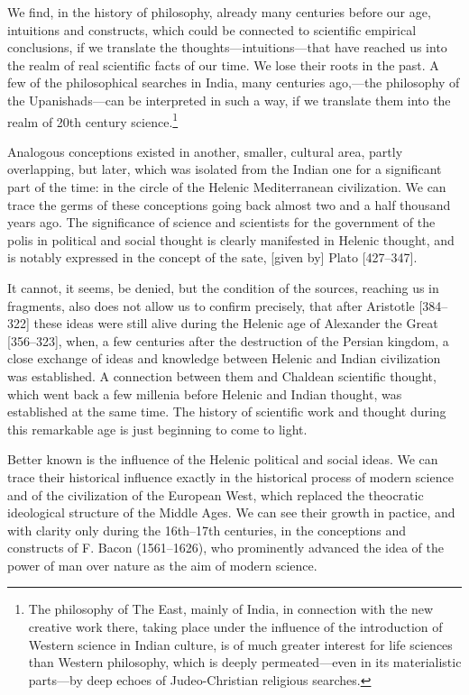 We find, in the history of philosophy, already many centuries before our age,
intuitions and constructs, which could be connected to scientific empirical
conclusions, if we translate the thoughts---intuitions---that have reached us
into the realm of real scientific facts of our time.  We lose their roots in
the past.  A few of the philosophical searches in India, many centuries
ago,---the philosophy of the Upanishads---can be interpreted in such a way, if
we translate them into the realm of 20th century science.\footnote{The
philosophy of The East, mainly of India, in connection with the new creative
work there, taking place under the influence of the introduction of Western
science in Indian culture, is of much greater interest for life sciences than
Western philosophy, which is deeply permeated---even in its materialistic
parts---by deep echoes of Judeo-Christian religious searches.}

Analogous conceptions existed in another, smaller, cultural area, partly
overlapping, but later, which was isolated from the Indian one for a
significant part of the time: in the circle of the Helenic Mediterranean
civilization.  We can trace the germs of these conceptions going back almost
two and a half thousand years ago.  The significance of science and scientists
for the government of the polis in political and social thought is clearly
manifested in Helenic thought, and is notably expressed in the concept of the
sate, [given by] Plato [427--347].

It cannot, it seems, be denied, but the condition of the sources, reaching us
in fragments, also does not allow us to confirm precisely, that after Aristotle
[384--322] these ideas were still alive during the Helenic age of Alexander the
Great [356--323], when, a few centuries after the destruction of the Persian
kingdom, a close exchange of ideas and knowledge between Helenic and Indian
civilization was established.  A connection between them and Chaldean
scientific thought, which went back a few millenia before Helenic and Indian
thought, was established at the same time.  The history of scientific work and
thought during this remarkable age is just beginning to come to light.

Better known is the influence of the Helenic political and social ideas.  We
can trace their historical influence exactly in the historical process of
modern science and of the civilization of the European West, which replaced the
theocratic ideological structure of the Middle Ages.  We can see their growth
in pactice, and with clarity only during the 16th--17th centuries, in the
conceptions and constructs of F. Bacon (1561--1626), who prominently advanced
the idea of the power of man over nature as the aim of modern science.

